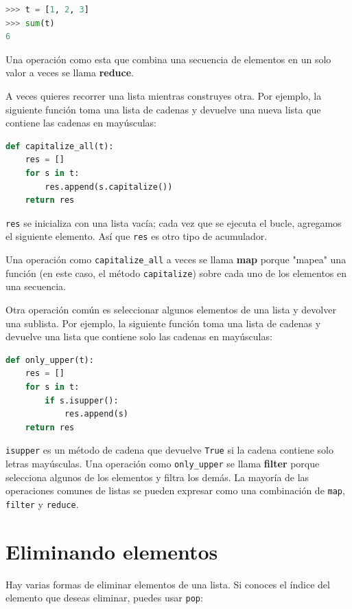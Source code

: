 \begin{lstlisting}[language=Python]
>>> t = [1, 2, 3] 
>>> sum(t) 
6
\end{lstlisting}

Una operación como esta que combina una secuencia de elementos en un solo valor a veces se llama \textbf{reduce}.

A veces quieres recorrer una lista mientras construyes otra. Por ejemplo, la siguiente función toma una lista de cadenas y devuelve una nueva lista que contiene las cadenas en mayúsculas:

\begin{lstlisting}[language=Python]
def capitalize_all(t):
    res = []
    for s in t:
        res.append(s.capitalize())
    return res
\end{lstlisting}

\texttt{res} se inicializa con una lista vacía; cada vez que se ejecuta el bucle, agregamos el siguiente elemento. Así que \texttt{res} es otro tipo de acumulador.

Una operación como \texttt{capitalize\_all} a veces se llama \textbf{map} porque "mapea" una función (en este caso, el método \texttt{capitalize}) sobre cada uno de los elementos en una secuencia.

Otra operación común es seleccionar algunos elementos de una lista y devolver una sublista. Por ejemplo, la siguiente función toma una lista de cadenas y devuelve una lista que contiene solo las cadenas en mayúsculas:

\begin{lstlisting}[language=Python]
def only_upper(t):
    res = []
    for s in t:
        if s.isupper():
            res.append(s)
    return res
\end{lstlisting}

\texttt{isupper} es un método de cadena que devuelve \texttt{True} si la cadena contiene solo letras mayúsculas. Una operación como \texttt{only\_upper} se llama \textbf{filter} porque selecciona algunos de los elementos y filtra los demás. La mayoría de las operaciones comunes de listas se pueden expresar como una combinación de \texttt{map}, \texttt{filter} y \texttt{reduce}.

\section{Eliminando elementos}

Hay varias formas de eliminar elementos de una lista. Si conoces el índice del elemento que deseas eliminar, puedes usar \texttt{pop}:

